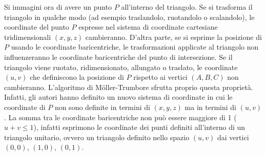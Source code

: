 Si immagini ora di avere un punto $P$ all'interno del triangolo. Se si trasforma il triangolo in qualche modo (ad esempio traslandolo, ruotandolo o scalandolo), le coordinate del punto $P$ espresse nel sistema di coordinate cartesiane tridimensionali $(x,y,z)$ cambieranno. D'altra parte, se si esprime la posizione di $P$ usando le coordinate baricentriche, le trasformazioni applicate al triangolo non influenzeranno le coordinate baricentriche del punto di intersezione. Se il triangolo viene ruotato, ridimensionato, allungato o traslato, le coordinate $(u,v)$ che definiscono la posizione di $P$ rispetto ai vertici $(A,B,C)$ non cambieranno. L'algoritmo di M\"oller-Trumbore sfrutta proprio questa proprietà. Infatti, gli autori hanno definito un nuovo sistema di coordinate in cui le coordinate di $P$ non sono definite in termini di $(x,y,z)$ ma in termini di $(u,v)$. La somma tra le coordinate baricentriche non può essere maggiore di 1 ($u + v \leq 1$), infatti esprimono le coordinate dei punti definiti all'interno di un triangolo unitario, ovvero un triangolo definito nello spazio $(u,v)$ dai vertici $(0,0)$, $(1,0)$, $(0,1)$.

